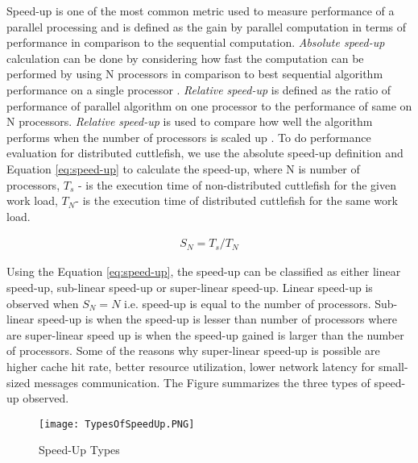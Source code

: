 Speed-up is one of the most common metric used to measure performance of a parallel processing and is defined as the gain by parallel computation in terms of performance in comparison to the sequential computation. \textit{Absolute speed-up} calculation can be done by considering how fast the computation can be performed by using N processors in comparison to best sequential algorithm performance on a single processor \cite{Speedup}. \textit{Relative speed-up }is defined as the ratio of performance of parallel algorithm on one processor to the performance of same on N processors. \textit{Relative speed-up} is used to compare how well the algorithm performs when the number of processors is scaled up \cite{Speedup}. To do performance evaluation for distributed cuttlefish, we use the absolute speed-up definition and Equation \ref{eq:speed-up} to calculate the speed-up, where N is number of processors, \begin{math} T_{s} \end{math} - is the execution time of non-distributed cuttlefish for the given work load, \begin{math} T_{N}\end{math}- is the execution time of distributed cuttlefish for the same work load.

\begin{equation}
\label{eq:speed-up}
\begin{aligned}
S_{N} = T_{s}/T_{N}
\end{aligned}
\end{equation}

Using the Equation \ref{eq:speed-up}, the speed-up can be classified as either linear speed-up, sub-linear speed-up or super-linear speed-up. Linear speed-up is observed when \begin{math}S_{N}=N \end{math} i.e. speed-up is equal to the number of processors. Sub-linear speed-up is when the speed-up is lesser than number of processors where are super-linear speed up is when the speed-up gained is larger than the number of processors. Some of the reasons why super-linear speed-up is possible are higher cache hit rate, better resource utilization, lower network latency for small-sized messages communication. The Figure summarizes the three types of speed-up observed. \newline 

\begin{figure}[t]
\centering
\texttt{[image: TypesOfSpeedUp.PNG]}
\caption{Speed-Up Types}
\label{fig:TypesOfSpeedUp}
\end{figure}

